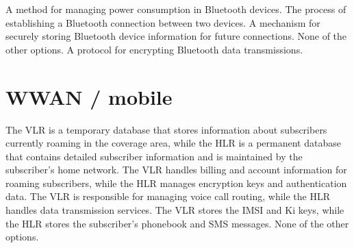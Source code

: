 \begin{questions}
    \begin{checkboxes}
        \choice A method for managing power consumption in Bluetooth devices.
        \CorrectChoice The process of establishing a Bluetooth connection between two devices.
        \choice A mechanism for securely storing Bluetooth device information for future connections.
        \choice None of the other options.
        \choice A protocol for encrypting Bluetooth data transmissions.
    \end{checkboxes}

    \section{WWAN / mobile}





    \begin{checkboxes}
        \CorrectChoice The VLR is a temporary database that stores information about subscribers currently roaming in the coverage area, while the HLR is a permanent database that contains detailed subscriber information and is maintained by the subscriber's home network.
        \choice The VLR handles billing and account information for roaming subscribers, while the HLR manages encryption keys and authentication data.
        \choice The VLR is responsible for managing voice call routing, while the HLR handles data transmission services.
        \choice The VLR stores the IMSI and Ki keys, while the HLR stores the subscriber's phonebook and SMS messages.
        \choice None of the other options.
    \end{checkboxes}







\end{questions}
